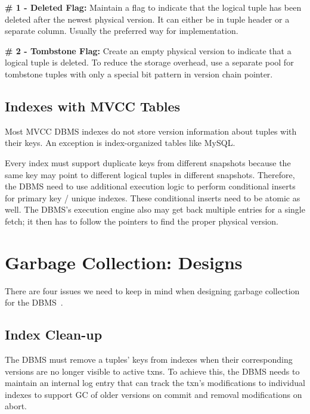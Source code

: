 \documentclass[11pt]{article}
\begin{document}
\textbf{\# 1 - Deleted Flag:} Maintain a flag to indicate that the logical tuple has been deleted after the newest physical version. It can either be in tuple header or a separate column. Usually the preferred way for implementation.

\textbf{\# 2 - Tombstone Flag:}
Create an empty physical version to indicate that a logical tuple is deleted. To reduce the storage overhead, use a separate pool for tombstone tuples  with only a special bit pattern in version chain pointer.

\subsection*{Indexes with MVCC Tables}
Most MVCC DBMS indexes do not store version information about tuples with their keys. An exception is index-organized tables like MySQL.

Every index must support duplicate keys from different snapshots because the same key may point to different logical tuples in
different snapshots. Therefore, the DBMS need to use additional execution logic to perform conditional inserts for primary key / unique indexes. These conditional inserts need to be atomic as well. The DBMS's execution engine also may get back multiple entries for a single
fetch; it then has to follow the pointers to find the proper physical version.

\section{Garbage Collection: Designs}
There are four issues we need to keep in mind when designing garbage collection for the DBMS~\cite{jlee2016sap}.

\subsection*{Index Clean-up}
The DBMS must remove a tuples' keys from
indexes when their corresponding versions are no longer visible to active txns. To achieve this, the DBMS needs to maintain an internal log entry that can track the txn's modifications to individual indexes to support GC of older versions on commit and removal modifications on abort.
\end{document}
